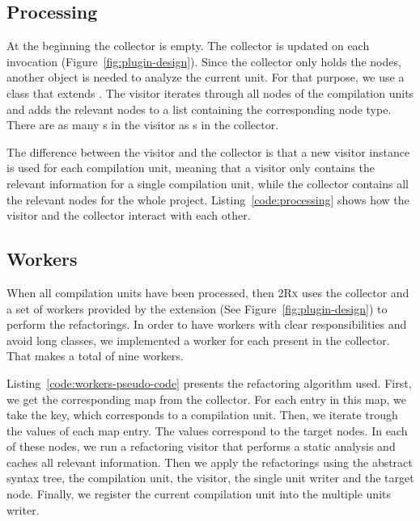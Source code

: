 \documentclass[type=bsc,accentcolor=tud9c]{tudthesis}
\newcommand{\toolcore}{\textsc{2Rx}}
\begin{document}


\subsection{Processing}
At the beginning the collector is empty. The collector is updated on each  invocation (Figure~\ref{fig:plugin-design}). Since the collector only holds the nodes, another object is needed to analyze the current unit. For that purpose, we use a class that extends . The visitor iterates through all nodes of the compilation units and adds the relevant nodes to a list containing the corresponding node type. There are as many s in the visitor as s in the collector.

The difference between the visitor and the collector is that a new visitor instance is used for each compilation unit, meaning that a visitor only contains the relevant information for a single compilation unit, while the collector contains all the relevant nodes for the whole project. Listing~\ref{code:processing} shows how the visitor and the collector interact with each other.



\subsection{Workers}
When all compilation units have been processed, then \toolcore{} uses the collector and a set of workers provided by the extension (See Figure~\ref{fig:plugin-design}) to perform the refactorings. In order to have workers with clear responsibilities and avoid long classes, we implemented a worker for each  present in the collector. That makes a total of nine workers.

Listing~\ref{code:workers-pseudo-code} presents the refactoring algorithm used. First, we get the corresponding map from the collector. For each entry in this map, we take the key, which corresponds to a compilation unit. Then, we iterate trough the values of each map entry. The values correspond to the target nodes. In each of these nodes, we run a refactoring visitor that performs a static analysis and caches all relevant information. Then we apply the refactorings using the abstract syntax tree, the compilation unit, the visitor, the single unit writer and the target node. Finally, we register the current compilation unit into the multiple units writer.
\end{document}
